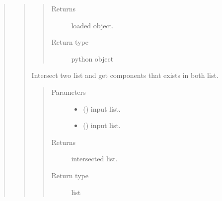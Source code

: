 \documentclass[letterpaper,10pt,english]{sphinxmanual}
\begin{document}
\begin{quote}
\begin{quote}
\begin{fulllineitems}
\begin{quote}
\begin{description}
\item[{Returns}] \leavevmode
loaded object.

\item[{Return type}] \leavevmode
python object

\end{description}\end{quote}

\end{fulllineitems}


\begin{fulllineitems}
\label{\detokenize{modules/celloracle.utility:celloracle.utility.intersect}}
Intersect two list and get components that exists in both list.
\begin{quote}\begin{description}
\item[{Parameters}] \leavevmode\begin{itemize}
\item {} 
 () \textendash{} input list.

\item {} 
 () \textendash{} input list.

\end{itemize}

\item[{Returns}] \leavevmode
intersected list.

\item[{Return type}] \leavevmode
list

\end{description}\end{quote}

\end{fulllineitems}



\end{quote}
\end{quote}
\end{document}
